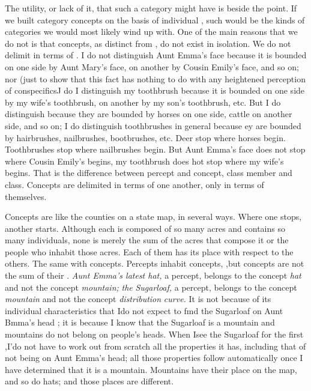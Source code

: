 The utility, or lack of it, that such a category might have is
beside the point. If we built category concepts on the basis of in\-dividual , such would be the kinds of categories we would most likely wind up with. One of the main reasons that we do not is that concepts, as distinct from , do not exist in isolation. We do not delimit  in terms of . I do not distinguish Aunt Emma's face because it is bounded on one side by Aunt Mary's face, on another by Cousin Emily's face, and so on; nor (just to show that this fact has nothing to do with any heightened perception of
conspecificsJ do I distinguish my toothbrush because it is bounded
on one side by my wife's toothbrush, on another by my son's tooth\-brush, etc. But I do distinguish  because they are bounded by horses on one side, cattle on another side, and so on; I do distinguish toothbrushes in general because ey are bounded by hairbrushes,
nailbrushes, bootbrushes, etc. Deer stop where horses begin. Tooth\-brushes stop where nailbrushes begin. But Aunt Emma's face does not stop where Cousin Emily's begins, my toothbrush does hot stop where my wife's begins. That is the difference between percept and concept, class member and class. Concepts are delimited in terms of one another,  only in terms of themselves.

Concepts are like the counties on a state map, in several ways. Where one stops, another starts. Although each is composed of so many acres and contains so many individuals, none is merely the sum of the acres that compose it or the people who inhabit those acres. Each of them has its place with respect to the others. The same with con\-cepts. Percepts inhabit concepts, ,but concepts are not the sum of their . \textit{Aunt Emma's latest hat,} a percept, belongs to the concept \textit{hat} and not the concept \textit{mountain;} \textit{the} \textit{Sugarloaf,} a percept, belongs to the concept \textit{mountain }and not the concept \textit{distribution} \textit{curve.} It is not because of its individual characteristics that Ido not expect to fmd the Sugarloaf on Aunt Bmma's head ; it is because I know that the Sugarloaf is a mountain and mountains do not belong on people's heads. When Isee the Sugarloaf for the first ,I'do not have to work out from scratch all the properties it has, including that of not being on Aunt Emma's head; all those properties follow auto\-matically once I have determined that it is a mountain. Mountains have their place on the map, and so do hats; and those places are different.

